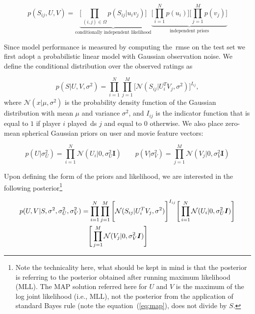 \begin{equation}
p(S_{ij},U,V) = \underbrace{\Bigg[\prod_{(i,j)\in\Omega} p(S_{ij}|u_{i}v_{j}) \Bigg]}_\text{conditionally independent likelihood} \underbrace{\Bigg[\prod_{i=1}^{N}p(u_{i})\Bigg] \Bigg[\prod_{j=1}^{M}p(v_{j})\Bigg]}_\text{independent priors}
\end{equation}


Since model performance is measured by computing the~\gls{rmse} on the test set we first adopt a probabilistic linear model with Gaussian observation noise. We define the conditional distribution over the observed ratings as

\begin{equation}
p(S|U,V,\sigma^{2}) = \prod_{i=1}^{N}\prod_{j=1}^{M} \Bigg[ \mathcal{N}(S_{ij}|U^{T}_{i}V_{j},\sigma^{2}) \Bigg]^{I_{ij}},
\end{equation}
where $\mathcal{N}(x|\mu, \sigma^{2})$ is the probability density function of the Gaussian distribution with mean $\mu$ and variance $\sigma^{2}$, and $I_{ij}$ is the indicator function that is equal to $1$ if player $i$ played~\gls{ds} $j$ and equal to 0 otherwise.  We also place zero-mean spherical Gaussian priors on user and movie feature vectors:

\begin{equation}\label{eq:map}
p(U|\sigma_{U}^{2}) = \prod_{i=1}^{N}\mathcal{N}(U_{i}|0,\sigma_{U}^{2}\boldsymbol{I}) \qquad p(V|\sigma_{V}^{2}) = \prod_{j=1}^{M}\mathcal{N}(V_{j}|0,\sigma_{V}^{2}\boldsymbol{I})
\end{equation}

Upon defining the form of the priors and likelihood, we are interested in the following posterior\footnote{Note the technicality here, what should be kept in mind is that the posterior is referring to the posterior obtained after running maximum likelihood (MLL). The MAP solution referred here for $U$ and $V$ is the maximum of the log joint likelihood (i.e., MLL), not the posterior from the application of standard Bayes rule (note the equation~(\ref{eq:map}), does not divide by $S$.}

\begin{align}
\small
p(U,V|S,\sigma^{2},\sigma_{U}^{2},\sigma_{V}^{2}) &= \prod_{i=1}^{N}\prod_{j=1}^{M} \Bigg[ \mathcal{N}(S_{ij}|U^{T}_{i}V_{j},\sigma^{2}) \Bigg]^{I_{ij}}\Bigg[\prod_{i=1}^{N}\mathcal{N}(U_{i}|0,\sigma_{U}^{2}\boldsymbol{I})\Bigg] \\ &\quad \Bigg[\prod_{j=1}^{M}\mathcal{N}(V_{j}|0,\sigma_{V}^{2}\boldsymbol{I})\Bigg]
\normalsize
\end{align}


